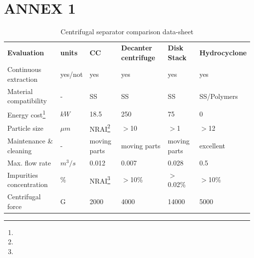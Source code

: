 \documentclass{article}
\numberwithin{table}{section}
\numberwithin{figure}{section}
\begin{document}

\newpage
{}
\printbibliography    


\newpage
\section*{ANNEX 1}\label{sec:annex_1}

\begin{table}[h!]
	\begin{tabular}{p{4cm}p{1cm}p{2cm}p{2cm}p{2cm}p{2cm}}
		\rule[-0.3cm]{0pt}{0.8cm} \textbf{Evaluation} & \textbf{units} & \textbf{CC} &\textbf{Decanter centrifuge} & \textbf{Disk Stack} & \textbf{Hydrocyclone} \\ \Xhline{1.3pt}
		\rule[-0.3cm]{0pt}{0.8cm} Continuous extraction & yes/not & yes & yes & yes & yes \\ \hline
		\rule[-0.3cm]{0pt}{0.8cm} Material compatibility & - & SS & SS & SS & SS/Polymers \\ \hline
		\rule[-0.3cm]{0pt}{0.8cm} Energy cost\footnote{} & $kW$ & 18.5 & 250 & 75 & 0 \\ \hline
		\rule[-0.3cm]{0pt}{0.8cm} Particle size & $\mu m$ & NRAI\footnote[2]{} & $>$10 & $>$1 & $>$12 \\ \hline
		\rule[-0.3cm]{0pt}{0.8cm} Maintenance \& cleaning & - & moving parts & moving parts & moving parts & excellent \\ \hline
		\rule[-0.3cm]{0pt}{0.8cm} Max. flow rate & $m^3/s$ & 0.012 & 0.007 & 0.028 & 0.5 \\ \hline
		\rule[-0.3cm]{0pt}{0.8cm} Impurities concentration & \% & NRAI\footnote[2]{} & $>$10\% & $>$0.02\% & $>$10\% \\ \hline
		\rule[-0.3cm]{0pt}{0.8cm} Centrifugal force& G & 2000 & 4000 & 14000 & 5000 \\ \hline
	\end{tabular}
	\captionsetup{font=bf, size=small}
	\caption{Centrifugal separator comparison data-sheet}
	\label{rad_values}
\end{table}


\end{document}
